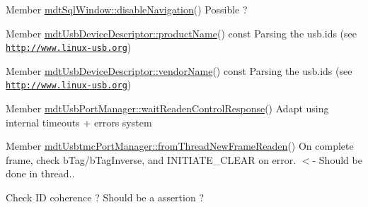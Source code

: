 \label{todo__todo000088}
\hypertarget{todo__todo000088}{}
 
\begin{DoxyDescription}
\item[Member \hyperlink{classmdt_sql_window_a961d587d63b0997a10db6728773a108f}{mdtSqlWindow::disableNavigation}() ]Possible ? 
\end{DoxyDescription}

\label{todo__todo000050}
\hypertarget{todo__todo000050}{}
 
\begin{DoxyDescription}
\item[Member \hyperlink{classmdt_usb_device_descriptor_a626afc71d8e72600f12259ac6f5a5866}{mdtUsbDeviceDescriptor::productName}() const  ]Parsing the usb.ids (see \href{http://www.linux-usb.org}{\tt http://www.linux-\/usb.org}) 
\end{DoxyDescription}

\label{todo__todo000049}
\hypertarget{todo__todo000049}{}
 
\begin{DoxyDescription}
\item[Member \hyperlink{classmdt_usb_device_descriptor_ac2f746ebd5540b65bf00f82c991f5c3b}{mdtUsbDeviceDescriptor::vendorName}() const  ]Parsing the usb.ids (see \href{http://www.linux-usb.org}{\tt http://www.linux-\/usb.org}) 
\end{DoxyDescription}

\label{todo__todo000054}
\hypertarget{todo__todo000054}{}
 
\begin{DoxyDescription}
\item[Member \hyperlink{classmdt_usb_port_manager_a34bf0ac118e586bf2547a98964a2230c}{mdtUsbPortManager::waitReadenControlResponse}() ]Adapt using internal timeouts + errors system 
\end{DoxyDescription}

\label{todo__todo000056}
\hypertarget{todo__todo000056}{}
 
\begin{DoxyDescription}
\item[Member \hyperlink{classmdt_usbtmc_port_manager_aca42b343ae1f6a324e6e45968f03bbea}{mdtUsbtmcPortManager::fromThreadNewFrameReaden}() ]On complete frame, check bTag/bTagInverse, and INITIATE\_\-CLEAR on error. $<$-\/ Should be done in thread.. 

Check ID coherence ? Should be a assertion ? 
\end{DoxyDescription}

